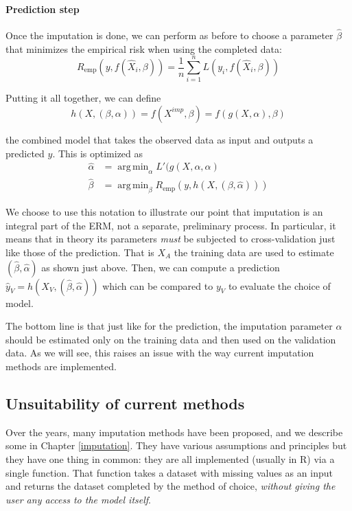\documentclass[12pt, a4paper]{memoir}
\DeclareMathOperator*{\argmin}{arg\,min}
\begin{document}
			\paragraph{Prediction step}
Once the imputation is done, we can perform as before to choose a parameter $\hat{\beta}$ that minimizes the empirical risk when using the completed data:
	$$ R_{\text{emp}}(y, f(\hat{X}_i, \beta)) = \frac{1}{n} \sum\limits_{i=1}^n L(y_i, f(\hat{X}_i, \beta))$$
	
Putting it all together, we can define 
$$ h(X, (\beta, \alpha)) = f(X^{imp}, \beta) = f( g(X, \alpha), \beta) $$

the combined model that takes the observed data as input and outputs a predicted $y$. This is optimized as 
\begin{align*}
\hat{\alpha} &= \argmin_{\alpha} L'(g(X,\alpha, \alpha) \\
\hat{\beta} &= \argmin_{\beta} R_{\text{emp}}(y, h(X, (\beta, \hat{\alpha})))
\end{align*}

We choose to use this notation to illustrate our point that imputation is an integral part of the ERM, not a separate, preliminary process. In particular, it means that in theory its parameters \emph{must} be subjected to cross-validation just like those of the prediction. That is $X_A$ the training data are used to estimate $(\hat{\beta}, \hat{\alpha})$ as shown just above. Then, we can compute a prediction $\hat{y}_V = h(X_V, (\hat{\beta}, \hat{\alpha}))$ which can be compared to $y_V$ to evaluate the choice of model.

The bottom line is that just like for the prediction, the imputation parameter $\alpha$ should be estimated only on the training data and then used on the validation data. As we will see, this raises an issue with the way current imputation methods are implemented.

		\subsection{Unsuitability of current methods}
Over the years, many imputation methods have been proposed, and we describe some in Chapter \ref{imputation}. They have various assumptions and principles but they have one thing in common: they are all implemented (usually in R) via a single function. That function takes a dataset with missing values as an input and returns the dataset completed by the method of choice, \emph{without giving the user any access to the model itself}.
\end{document}
